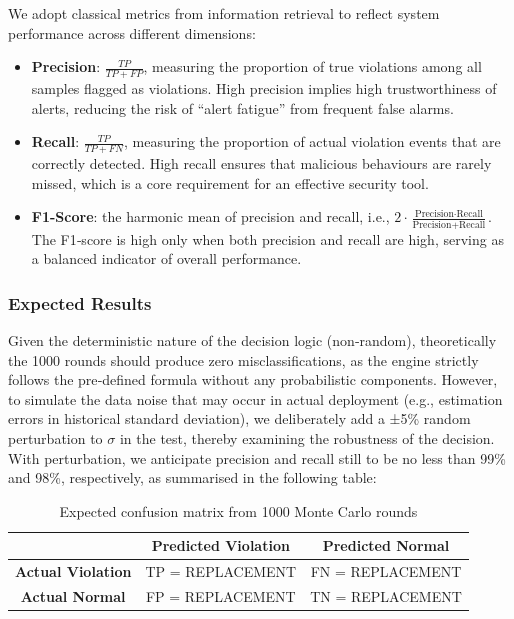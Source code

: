 We adopt classical metrics from information retrieval to reflect system performance across different dimensions:

\begin{itemize}
\item \textbf{Precision}: $\frac{TP}{TP+FP}$, measuring the proportion of true violations among all samples flagged as violations. High precision implies high trustworthiness of alerts, reducing the risk of “alert fatigue” from frequent false alarms.
\item \textbf{Recall}: $\frac{TP}{TP+FN}$, measuring the proportion of actual violation events that are correctly detected. High recall ensures that malicious behaviours are rarely missed, which is a core requirement for an effective security tool.
\item \textbf{F1-Score}: the harmonic mean of precision and recall, i.e., $2 \cdot \frac{\text{Precision} \cdot \text{Recall}}{\text{Precision} + \text{Recall}}$. The F1‑score is high only when both precision and recall are high, serving as a balanced indicator of overall performance.
\end{itemize}

\subsubsection{Expected Results}

Given the deterministic nature of the decision logic (non‑random), theoretically the 1000 rounds should produce zero misclassifications, as the engine strictly follows the pre‑defined formula without any probabilistic components. However, to simulate the data noise that may occur in actual deployment (e.g., estimation errors in historical standard deviation), we deliberately add a ±5\% random perturbation to $\sigma$ in the test, thereby examining the robustness of the decision. With perturbation, we anticipate precision and recall still to be no less than 99\% and 98\%, respectively, as summarised in the following table:

\begin{table}[H]
\centering
\caption{Expected confusion matrix from 1000 Monte Carlo rounds}
\begin{tabular}{c|c|c}
\toprule
 & \textbf{Predicted Violation} & \textbf{Predicted Normal} \\
\midrule
\textbf{Actual Violation} & TP = REPLACEMENT & FN = REPLACEMENT \\
\textbf{Actual Normal} & FP = REPLACEMENT & TN = REPLACEMENT \\
\bottomrule
\end{tabular}
\end{table}

